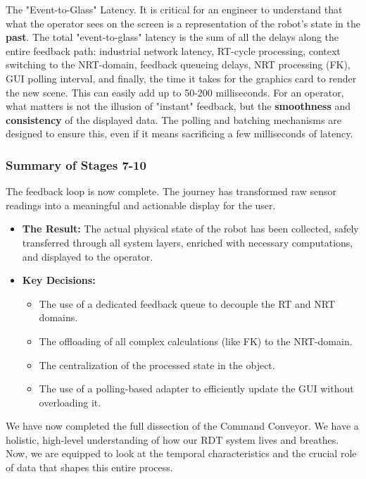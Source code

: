 \begin{dangerbox}{The "Event-to-Glass" Latency.}
    It is critical for an engineer to understand that what the operator sees on the screen is a representation of the robot's state in the \textbf{past}. The total "event-to-glass" latency is the sum of all the delays along the entire feedback path: industrial network latency, RT-cycle processing, context switching to the NRT-domain, feedback queueing delays, NRT processing (FK), GUI polling interval, and finally, the time it takes for the graphics card to render the new scene. This can easily add up to 50-200 milliseconds. For an operator, what matters is not the illusion of "instant" feedback, but the \textbf{smoothness} and \textbf{consistency} of the displayed data. The polling and batching mechanisms are designed to ensure this, even if it means sacrificing a few milliseconds of latency.
\end{dangerbox}

\subsubsection{Summary of Stages 7-10}
\label{subsubsec:stage7_10_summary}

The feedback loop is now complete. The journey has transformed raw sensor readings into a meaningful and actionable display for the user.
\begin{itemize}
    \item \textbf{The Result:} The actual physical state of the robot has been collected, safely transferred through all system layers, enriched with necessary computations, and displayed to the operator.
    \item \textbf{Key Decisions:}
    \begin{itemize}
        \item The use of a dedicated feedback queue to decouple the RT and NRT domains.
        \item The offloading of all complex calculations (like FK) to the NRT-domain.
        \item The centralization of the processed state in the  object.
        \item The use of a polling-based adapter to efficiently update the GUI without overloading it.
    \end{itemize}
\end{itemize}
We have now completed the full dissection of the Command Conveyor. We have a holistic, high-level understanding of how our RDT system lives and breathes. Now, we are equipped to look at the temporal characteristics and the crucial role of data that shapes this entire process.

